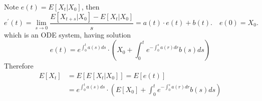 \documentclass{article}
\begin{document}
Note  $e(t)=E\left[X_{t} | X_{0}\right]$, then
\begin{equation}
    e^{\prime}(t)=\lim _{s \rightarrow 0} \frac{E\left[X_{t+s} | X_{0}\right]-E\left[X_{t} | X_{0}\right]}{s}=a(t) \cdot e(t)+b(t) . \quad e(0)=X_{0} .    
\end{equation}
which is an ODE system, having solution
\begin{equation}
    e(t)=e^{\int_{0}^{t} a(s) d s}\cdot\left(X_{0}+\int_{0}^{t} e^{-\int_{0}^{s} a(r) d r} b(s) d s\right)
\end{equation}
Therefore
\begin{equation}
    \begin{aligned}
    E\left[X_{t}\right] & =E\left[E\left[X_{t} | X_{0}\right]\right]=E[e(t)] \\
    & =e^{\int_{0}^{t} a(s) d s}\cdot\left(E\left[X_{0}\right]+\int_{0}^{t} e^{-\int_{0}^{s} a(r) d r} b(s) d s\right) 
    \end{aligned}
\end{equation}
\end{document}
